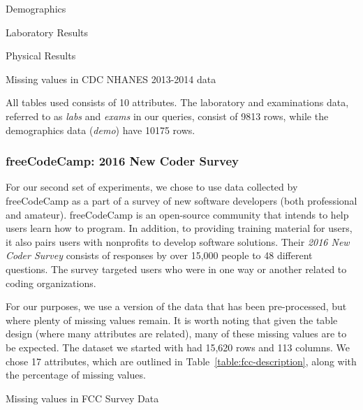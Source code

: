 \begin{table}
    \centering
    \begin{subtable}{0.5\textwidth}
        \centering
       
        \caption{Demographics}
    \end{subtable}
    \begin{subtable}{0.5\textwidth}
        \centering
        
        \caption{Laboratory Results}
    \end{subtable}
       \begin{subtable}{0.5\textwidth}
        \centering
        
        \caption{Physical Results}
    \end{subtable}
    \caption{Missing values in CDC NHANES 2013-2014 data}
    \label{table:nhanes-description} 
\end{table}

All tables used consists of 10 attributes. The laboratory and examinations data,
referred to as \textit{labs} and \textit{exams} in our queries, consist of 9813 rows,
while the demographics data (\textit{demo}) have 10175 rows.

\subsubsection{freeCodeCamp: 2016 New Coder Survey}
For our second set of experiments, we chose to use data collected
by freeCodeCamp as a part of a survey of new software developers
(both professional and amateur)\cite{fcc-data}. freeCodeCamp is an open-source
community that intends to help users learn how to program. In addition,
to providing training material for users, it also pairs users with
nonprofits to develop software solutions. Their \textit{2016 New Coder Survey} consists of responses by over 15,000 people to 48 different
questions. The survey targeted users who were in one way or another
related to coding organizations.

For our purposes, we use a version of the data that has been 
pre-processed, but where plenty of missing values remain. It is
worth noting that given the table design (where many attributes
are related), many of these missing values are to be
expected. The dataset we started with had 15,620 rows and 113
columns. We chose 17 attributes, which are outlined in Table~\ref{table:fcc-description}, along with the percentage of missing values.

\begin{table}
   \centering
    
    \caption{Missing values in FCC Survey Data}
   \label{table:fcc-description} 
\end{table}

